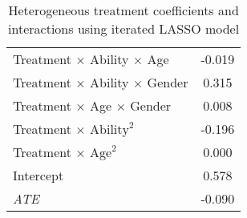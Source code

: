 \begin{table}
\begin{tabular}{lc}
Treatment $\times$ Ability $\times$ Age & -0.019 \\
Treatment $\times$ Ability $\times$ Gender & 0.315 \\
Treatment $\times$ Age $\times$ Gender & 0.008 \\
Treatment $\times$ $\text{Ability}^2$ & -0.196 \\
Treatment $\times$ $\text{Age}^2$ & 0.000 \\
Intercept & 0.578 \\
\hline
\textit{ATE} & -0.090 \\
\hline \hline
\end{tabular}
\caption{Heterogeneous treatment coefficients and interactions using iterated LASSO model} \label{tab:hetero}
\end{table}
